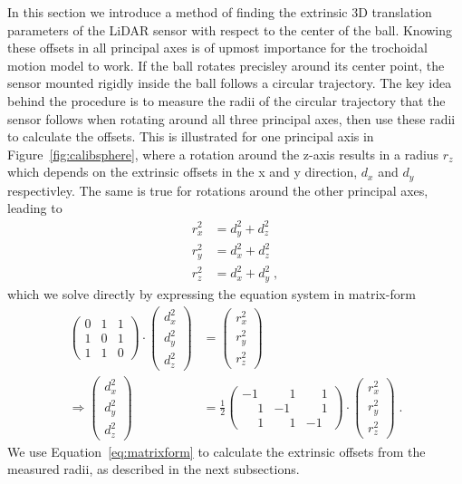 In this section we introduce a method of finding the extrinsic 3D translation parameters of the LiDAR sensor with respect to the center of the ball.
Knowing these offsets in all principal axes is of upmost importance for the trochoidal motion model to work.
If the ball rotates precisley around its center point, the sensor mounted rigidly inside the ball follows a circular trajectory.
The key idea behind the procedure is to measure the radii of the circular trajectory that the sensor follows when rotating around all three principal axes, then use these radii to calculate the offsets.
This is illustrated for one principal axis in Figure~\ref{fig:calibsphere}, where a rotation around the z-axis results in a radius $r_z$ which depends on the extrinsic offsets in the x and y direction, $d_x$ and $d_y$ respectivley.
The same is true for rotations around the other principal axes, leading to  
\begin{align}
  r_x^2 &= d_y^2 + d_z^2 \nonumber \\
  r_y^2 &= d_x^2 + d_z^2 \nonumber \\
  r_z^2 &= d_x^2 + d_y^2 \;,
  \label{eq:equationsystem}
\end{align}
which we solve directly by expressing the equation system in matrix-form
\begin{align}
  \begin{pmatrix}
    0 & 1 & 1 \\
    1 & 0 & 1 \\
    1 & 1 & 0
  \end{pmatrix}
  \cdot 
  \begin{pmatrix}
    d_x^2 \\
    d_y^2 \\
    d_z^2
  \end{pmatrix}
  &= 
  \begin{pmatrix}
    r_x^2 \\
    r_y^2 \\
    r_z^2
  \end{pmatrix} \nonumber \\
  \Rightarrow
  \begin{pmatrix}
    d_x^2 \\
    d_y^2 \\
    d_z^2
  \end{pmatrix}
  &= \frac{1}{2}
  \begin{pmatrix}
    -1 & \phantom{-}1 & \phantom{-}1 \\
    \phantom{-}1 & -1 & \phantom{-}1 \\
    \phantom{-}1 &  \phantom{-}1 & -1
  \end{pmatrix} 
  \cdot 
  \begin{pmatrix}
    r_x^2 \\
    r_y^2 \\
    r_z^2
  \end{pmatrix}\;.
  \label{eq:matrixform}
\end{align}
We use Equation~\eqref{eq:matrixform} to calculate the extrinsic offsets from the measured radii, as described in the next subsections.

